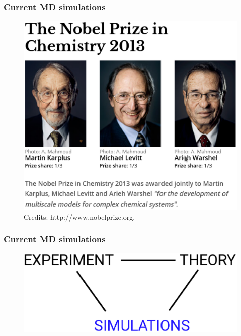 \documentclass{beamer}
\begin{document}
\begin{frame}\frametitle{Current MD simulations}

\begin{figure}
\includegraphics[scale=0.33]{nobel_prize.eps}
\caption{{\scriptsize Credits: http://www.nobelprize.org.}}
\end{figure}

\end{frame}



\begin{frame}\frametitle{Current MD simulations}

\begin{figure}
\includegraphics[scale=0.39]{three_approaches.eps}
\end{figure}

\end{frame}
\end{document}
